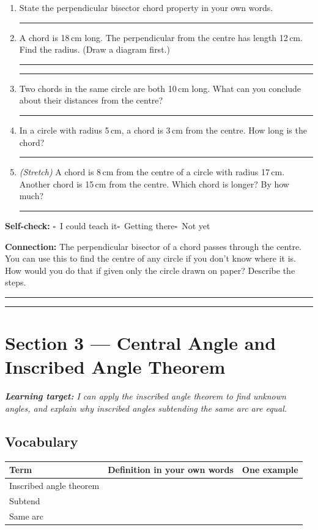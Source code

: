 \documentclass[11pt, a4paper]{article}
\newcommand{\answerline}{\par\vspace{0.45cm}\noindent\rule{\linewidth}{0.4pt}\par\vspace{0.1cm}}
\newcommand{\selfcheck}{\par\smallskip\noindent\textbf{Self-check:}
  $\square$~I could teach it\quad$\square$~Getting there\quad$\square$~Not yet\smallskip}
\begin{document}
\begin{tcolorbox}[retrieval]
\begin{enumerate}[leftmargin=*, itemsep=10pt]
  \item State the perpendicular bisector chord property in your own words. \answerline
  \item A chord is 18\,cm long. The perpendicular from the centre has length 12\,cm. Find the radius. (Draw a diagram first.) \answerline\answerline
  \item Two chords in the same circle are both 10\,cm long. What can you conclude about their distances from the centre? \answerline
  \item In a circle with radius 5\,cm, a chord is 3\,cm from the centre. How long is the chord? \answerline
  \item \textit{(Stretch)} A chord is 8\,cm from the centre of a circle with radius 17\,cm. Another chord is 15\,cm from the centre. Which chord is longer? By how much? \answerline
\end{enumerate}
\selfcheck
\end{tcolorbox}

\begin{tcolorbox}[connection]
\small\textbf{Connection:} The perpendicular bisector of a chord passes through the centre. You can use this to find the centre of any circle if you don't know where it is. How would you do that if given only the circle drawn on paper? Describe the steps.
\answerline\answerline
\end{tcolorbox}

\clearpage

\section{Section 3 --- Central Angle and Inscribed Angle Theorem}

\begin{tcolorbox}[learningtarget]
\small\textit{\textbf{Learning target:} I can apply the inscribed angle theorem to find unknown angles, and explain why inscribed angles subtending the same arc are equal.}
\end{tcolorbox}

\subsection{Vocabulary}

\renewcommand{\arraystretch}{1.9}
\begin{tabularx}{\linewidth}{|p{4.2cm}|X|X|}
\hline
\rowcolor{accentlight}\textbf{Term} & \textbf{Definition in your own words} & \textbf{One example} \\
\hline
Inscribed angle theorem & & \\ \hline
Subtend                 & & \\ \hline
Same arc                & & \\ \hline
\end{tabularx}
\renewcommand{\arraystretch}{1}
\end{document}

